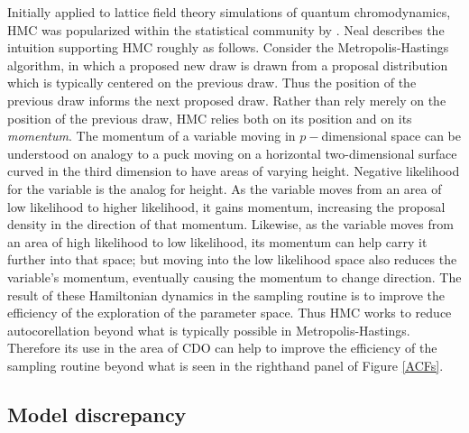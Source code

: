 \documentclass{article}
\begin{document}
Initially applied to lattice field theory simulations of quantum chromodynamics, HMC was popularized within the statistical community by \cite{Neal2011}. Neal describes the intuition supporting HMC roughly as follows. Consider the Metropolis-Hastings algorithm, in which a proposed new draw is drawn from a proposal distribution which is typically centered on the previous draw. Thus the position of the previous draw informs the next proposed draw. Rather than rely merely on the position of the previous draw, HMC relies both on its position and on its \emph{momentum}. The momentum of a variable moving in $p-$dimensional space can be understood on analogy to a puck moving on a horizontal two-dimensional surface curved in the third dimension to have areas of varying height. Negative likelihood for the variable is the analog for height. As the variable moves from an area of low likelihood to higher likelihood, it gains momentum, increasing the proposal density in the direction of that momentum. Likewise, as the variable moves from an area of high likelihood to low likelihood, its momentum can help carry it further into that space; but moving into the low likelihood space also reduces the variable's momentum, eventually causing the momentum to change direction.
The result of these Hamiltonian dynamics in the sampling routine is to improve the efficiency of the exploration of the parameter space. Thus HMC works to reduce autocorellation beyond what is typically possible in Metropolis-Hastings. Therefore its use in the area of CDO can help to improve the efficiency of the sampling routine beyond what is seen in the righthand panel of Figure \ref{ACFs}.



\subsection{Model discrepancy}
\end{document}
